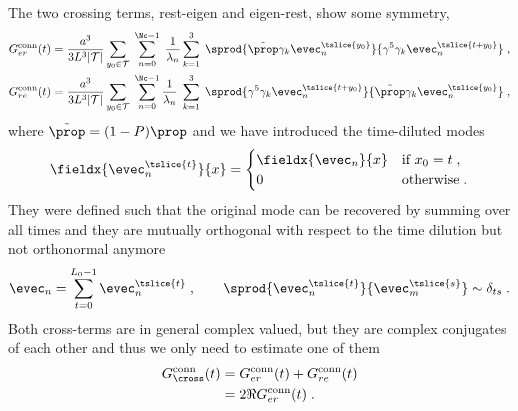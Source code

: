 The two crossing terms, rest-eigen and eigen-rest, show some symmetry,
\begin{align}
G_{er}^{\text{conn}}(t) &=
\frac{a^{3}}{3 L^{3} \lvert \mathcal{T} \rvert}
\sum_{y_0 \in \mathcal{T}} \;
\sum_{n=0}^{\Nc-1} \; \frac{1}{\lambda_{n}}
\sum_{k=1}^{3} \;
\sprod{
  \tilde{\prop}
  \gamma_k
  \evec_{n}^{\tslice{y_0}}
}{
  \gamma^{5}
  \gamma_k
  \evec_{n}^{\tslice{t+y_0}}
} \;, \\
G_{re}^{\text{conn}}(t) &=
\frac{a^{3}}{3 L^{3} \lvert \mathcal{T} \rvert}
\sum_{y_0 \in \mathcal{T}} \;
\sum_{n=0}^{\Nc-1} \frac{1}{\lambda_{n}} \;
\sum_{k=1}^{3} \;
\sprod{
  \gamma^{5}
  \gamma_k
  \evec_{n}^{\tslice{t+y_0}}
}{
  \tilde{\prop}
  \gamma_k
  \evec_{n}^{\tslice{y_0}}
} \;,
\end{align}
where $\tilde{\prop} = (1-P) \prop$ and we have introduced the time-diluted modes
\begin{equation}
\fieldx{\evec_{n}^{\tslice{t}}}{x} =
\begin{cases}
  \fieldx{\evec_{n}}{x} & \text{if } x_0 = t \;, \\
  0 & \text{otherwise} \;.
\end{cases} 
\end{equation}
They were defined such that the original mode can be recovered by summing over all times and they are mutually orthogonal with respect to the time dilution but not orthonormal anymore
\begin{equation}
\evec_{n} = \sum_{t=0}^{L_0-1} \evec_{n}^{\tslice{t}} \;,
\qquad
\sprod{\evec_{n}^{\tslice{t}}}{\evec_{m}^{\tslice{s}}} \sim \delta_{ts} \;. %
\end{equation}
Both cross-terms are in general complex valued, but they are complex conjugates of each other and thus we only need to estimate one of them
\begin{align}
G_{\cross}^{\text{conn}}(t)
&= G_{er}^{\text{conn}}(t) + G_{re}^{\text{conn}}(t) \\
&= 2 \Re{G_{er}^{\text{conn}}(t)} \;.
\end{align}

